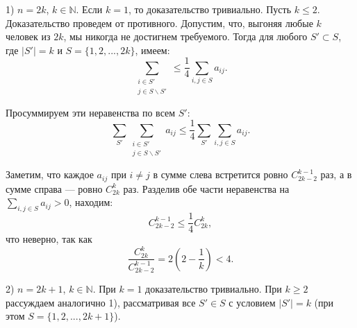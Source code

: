 \documentclass[11pt, a4paper]{article}
\begin{document}
\begin{enumerate}
1) $n = 2k$, $k \in \mathbb{N}$. Если $k = 1$, то доказательство тривиально. Пусть $k \leqslant 2$. Доказательство проведем от противного. Допустим, что, выгоняя любые $k$ человек из $2k$, мы никогда не достигнем требуемого. Тогда для любого $S' \subset S$, где $|S'| = k$ и $S = \{1, 2, ..., 2k \}$, имеем:
$$\sum_{\substack{i \in S' \\ j \in S \backslash S'}} \leqslant \frac{1}{4} \sum_{i, j \in S} a_{ij}.$$

Просуммируем эти неравенства по всем $S'$:
$$\sum_{S'} \sum_{\substack{i \in S' \\ j \in S \backslash S'}} a_{ij} \leqslant \frac{1}{4} \sum_{S'} \sum_{i, j \in S} a_{ij}.$$

Заметим, что каждое $a_{ij}$ при $i \neq j$ в сумме слева встретится ровно $C_{2k-2}^{k-1}$ раз, а в сумме справа --- ровно $C_{2k}^{k}$ раз. Разделив обе части неравенства на $\sum_{i, j \in S} a_{ij} > 0$, находим:
$$ C_{2k-2}^{k-1} \leqslant \frac{1}{4} C_{2k}^k,$$
что неверно, так как 
$$\frac{C_{2k}^{k}}{C_{2k-2}^{k-1}} = 2 \left( 2 - \frac{1}{k} \right) < 4.$$

2) $n = 2k + 1$, $k \in \mathbb{N}$. При $k = 1$ доказательство тривиально. При $k \geqslant 2$ рассуждаем аналогично 1), рассматривая все $S' \in S$ с условием $|S'| = k$ (при этом $S = \{1, 2, ..., 2k+1\}$).

\end{enumerate}
\end{document}
